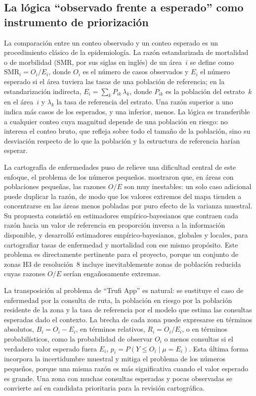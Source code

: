 \subsection{La lógica \texorpdfstring{\enquote{observado frente a esperado}}{"observado frente a esperado"} como instrumento de priorización}
\label{subsec:observado-esperado}

La comparación entre un conteo observado y un conteo esperado es un procedimiento clásico
de la epidemiología. La razón estandarizada de mortalidad o de morbilidad (SMR, por sus
siglas en inglés) de un área~$i$ se define como $\mathrm{SMR}_i = O_i / E_i$, donde $O_i$ es
el número de casos observados y $E_i$ el número esperado si el área tuviera las tasas de una
población de referencia; en la estandarización indirecta, $E_i = \sum_k P_{ik}\,\lambda_k$,
donde $P_{ik}$ es la población del estrato~$k$ en el área~$i$ y $\lambda_k$ la tasa de
referencia del estrato. Una razón superior a uno indica más casos de los esperados, y una
inferior, menos. La lógica es transferible a cualquier conteo cuya magnitud depende de una
población en riesgo: no interesa el conteo bruto, que refleja sobre todo el tamaño de la
población, sino su desviación respecto de lo que la población y la estructura de referencia
harían esperar.

La cartografía de enfermedades puso de relieve una dificultad central de este enfoque, el
problema de los números pequeños. \textcite{clayton1987} mostraron que, en áreas con
poblaciones pequeñas, las razones $O/E$ son muy inestables: un solo caso adicional puede
duplicar la razón, de modo que los valores extremos del mapa tienden a concentrarse en las
áreas menos pobladas por puro efecto de la varianza muestral. Su propuesta consistió en
estimadores empírico-bayesianos que contraen cada razón hacia un valor de referencia en
proporción inversa a la información disponible, y \textcite{marshall1991} desarrolló
estimadores empírico-bayesianos, globales y locales, para cartografiar tasas de enfermedad y
mortalidad con ese mismo propósito. Este problema es directamente pertinente para el
proyecto, porque un conjunto de zonas H3 de resolución~8 incluye inevitablemente zonas de
población reducida cuyas razones $O/E$ serían engañosamente extremas.

La transposición al problema de ``Trufi App'' es natural: se sustituye el caso de enfermedad
por la consulta de ruta, la población en riesgo por la población residente de la zona y la
tasa de referencia por el modelo que estima las consultas esperadas dado el contexto. La
brecha de cada zona puede expresarse en términos absolutos, $B_i = O_i - E_i$, en términos
relativos, $R_i = O_i / E_i$, o en términos probabilísticos, como la probabilidad de
observar $O_i$ o menos consultas si el verdadero valor esperado fuera $E_i$,
$p_i = P(Y \le O_i \mid \mu = E_i)$. Esta última forma incorpora la incertidumbre muestral y
mitiga el problema de los números pequeños, porque una misma razón es más significativa
cuando el valor esperado es grande. Una zona con muchas consultas esperadas y pocas
observadas se convierte así en candidata prioritaria para la revisión cartográfica.

